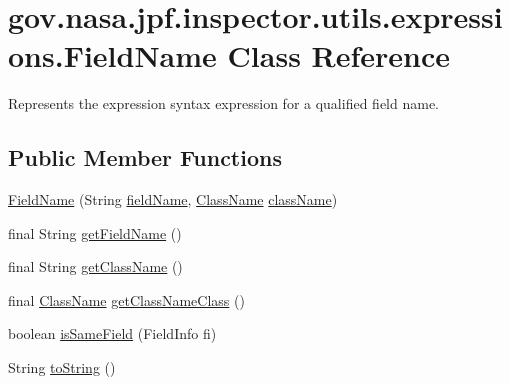 \hypertarget{classgov_1_1nasa_1_1jpf_1_1inspector_1_1utils_1_1expressions_1_1_field_name}{}\section{gov.\+nasa.\+jpf.\+inspector.\+utils.\+expressions.\+Field\+Name Class Reference}
\label{classgov_1_1nasa_1_1jpf_1_1inspector_1_1utils_1_1expressions_1_1_field_name}


Represents the expression syntax expression for a qualified field name.  


\subsection*{Public Member Functions}
\begin{DoxyCompactItemize}
\item 
\hyperlink{classgov_1_1nasa_1_1jpf_1_1inspector_1_1utils_1_1expressions_1_1_field_name_a58ae2c226a278f19a3a1cf7b07e0a4cd}{Field\+Name} (String \hyperlink{classgov_1_1nasa_1_1jpf_1_1inspector_1_1utils_1_1expressions_1_1_field_name_ab14e6c0f870a6f8102c81e4508381398}{field\+Name}, \hyperlink{classgov_1_1nasa_1_1jpf_1_1inspector_1_1utils_1_1expressions_1_1_class_name}{Class\+Name} \hyperlink{classgov_1_1nasa_1_1jpf_1_1inspector_1_1utils_1_1expressions_1_1_field_name_a7e0bc240628f2e0be2306157c50d6da7}{class\+Name})
\item 
final String \hyperlink{classgov_1_1nasa_1_1jpf_1_1inspector_1_1utils_1_1expressions_1_1_field_name_a76fe0ecb4b1b6742f8bf35ac4fd48f14}{get\+Field\+Name} ()
\item 
final String \hyperlink{classgov_1_1nasa_1_1jpf_1_1inspector_1_1utils_1_1expressions_1_1_field_name_a48e66ad1cd4b4a47acfb6871192ba262}{get\+Class\+Name} ()
\item 
final \hyperlink{classgov_1_1nasa_1_1jpf_1_1inspector_1_1utils_1_1expressions_1_1_class_name}{Class\+Name} \hyperlink{classgov_1_1nasa_1_1jpf_1_1inspector_1_1utils_1_1expressions_1_1_field_name_a211719c613bae491477512430b352b64}{get\+Class\+Name\+Class} ()
\item 
boolean \hyperlink{classgov_1_1nasa_1_1jpf_1_1inspector_1_1utils_1_1expressions_1_1_field_name_a0e9455190321f56a5f9afb01b66157fa}{is\+Same\+Field} (Field\+Info fi)
\item 
String \hyperlink{classgov_1_1nasa_1_1jpf_1_1inspector_1_1utils_1_1expressions_1_1_field_name_ac09c6dc150091a9bd549127baea01d03}{to\+String} ()
\end{DoxyCompactItemize}
